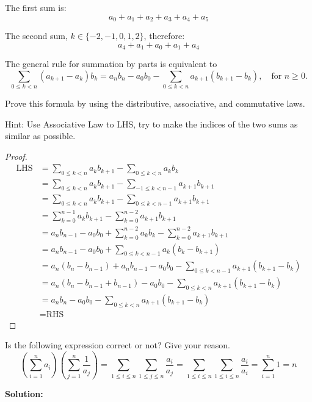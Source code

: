 \documentclass[
	12pt, %
	fleqn, %
	a4paper, %
]{LegrandOrangeBook}
\begin{document}
The first sum is:
\[
a_0 + a_1 + a_2 + a_3 + a_4 + a_5
\]

The second sum,  $k \in \{-2, -1, 0, 1, 2\}$, therefore:
\[
a_4 + a_1 + a_0 + a_1 + a_4
\]

\begin{exercise}
    The general rule for summation by parts is equivalent to
\[
\sum_{0 \leq k < n} (a_{k+1} - a_k)b_k = a_nb_n - a_0b_0 - \sum_{0 \leq k < n} a_{k+1}(b_{k+1} - b_k), \quad \text{for } n \geq 0.
\]

Prove this formula by using the distributive, associative, and commutative laws.
\end{exercise}
Hint: Use Associative Law to LHS, try to make the indices of the two sums as similar as possible.
\begin{proof}
    \begin{align*}
        \text{LHS} &= \sum_{0\leq k < n} a_k b_{k+1} - \sum_{0\leq k < n} a_k b_k \\
        &= \sum_{0\leq k < n} a_k b_{k+1} - \sum_{-1\leq k < n-1} a_{k+1} b_{k+1} \\
        &= \sum_{0\leq k < n} a_k b_{k+1} - \sum_{0\leq k < n-1} a_{k+1} b_{k+1} \\
        &= \sum_{k=0}^{n-1} a_k b_{k+1} - \sum_{k=0}^{n-2} a_{k+1} b_{k+1} \\
        &= a_n b_{n-1} - a_0 b_0 + \sum_{k=0}^{n-2} a_k b_k - \sum_{k=0}^{n-2} a_{k+1} b_{k+1} \\
        &= a_n b_{n-1} - a_0 b_0 + \sum_{0\leq k < n-1} a_k (b_k - b_{k+1}) \\
        &= a_n (b_n - b_{n-1}) + a_n b_{n-1} - a_0 b_0 - \sum_{0\leq k < n-1} a_{k+1} (b_{k+1} - b_k) \\
        &= a_n (b_n - b_{n-1} + b_{n-1}) - a_0 b_0 - \sum_{0\leq k < n} a_{k+1} (b_{k+1} - b_k) \\
        &= a_n b_n - a_0 b_0 - \sum_{0\leq k < n} a_{k+1} (b_{k+1} - b_k) \\
        &= \text{RHS}
        \end{align*}
\end{proof}
\begin{exercise}
    Is the following expression correct or not? Give your reason.
    \[
\left( \sum_{i=1}^{n} a_i \right) \left( \sum_{j=1}^{n} \frac{1}{a_j} \right) = \sum_{1 \leq i \leq n} \sum_{1 \leq j \leq n} \frac{a_i}{a_j} = \sum_{1 \leq i \leq n} \sum_{1 \leq i \leq n} \frac{a_i}{a_i} = \sum_{i=1}^{n} 1 = n
\]
\end{exercise}
\textbf{Solution:}
\end{document}

